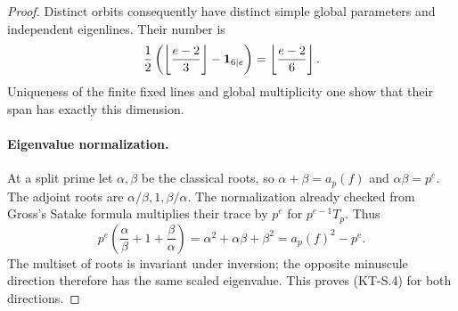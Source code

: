 \begin{proof}
Distinct orbits consequently have distinct simple global
parameters and independent eigenlines.  Their number is
\[
 \frac12\left(
        \left\lfloor\frac{e-2}{3}\right\rfloor
          -{\bf1}_{6\mid e}\right)
        =\left\lfloor\frac{e-2}{6}\right\rfloor.
\]
Uniqueness of the finite fixed lines and global multiplicity
one show that their span has exactly this dimension.

\paragraph{Eigenvalue normalization.}
At a split prime let $\alpha,\beta$ be the classical roots,
so $\alpha+\beta=a_p(f)$ and $\alpha\beta=p^e$.
The adjoint roots are $\alpha/\beta,1,\beta/\alpha$.
The normalization already checked from Gross's Satake formula
multiplies their trace by $p^e$ for $p^{e-1}T_p$.  Thus
\[
 p^e\left(\frac\alpha\beta+1+\frac\beta\alpha\right)
       =\alpha^2+\alpha\beta+\beta^2
       =a_p(f)^2-p^e.
\]
The multiset of roots is invariant under inversion; the
opposite minuscule direction therefore has the same scaled
eigenvalue.  This proves (KT-S.4) for both directions.
\end{proof}

